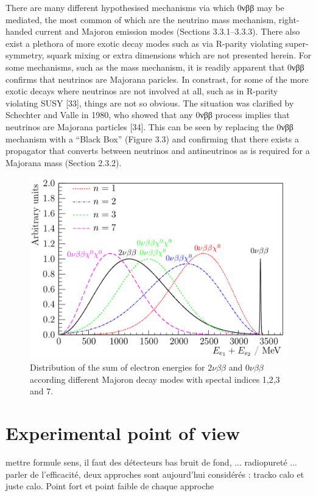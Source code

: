 \documentclass[main.tex]{subfiles}
\begin{document}
\ifx
There are many different hypothesised mechanisms via which 0νββ may be mediated,
the most common of which are the neutrino mass mechanism, right-handed current
and Majoron emission modes (Sections 3.3.1–3.3.3). There also exist a plethora of
more exotic decay modes such as via R-parity violating super-symmetry, squark
mixing or extra dimensions which are not presented herein.
For some mechanisms, such as the mass mechanism, it is readily apparent that 0νββ
confirms that neutrinos are Majorana paricles. In constrast, for some of the more
exotic decays where neutrinos are not involved at all, such as in R-parity violating
SUSY [33], things are not so obvious. The situation was clarified by Schechter and
Valle in 1980, who showed that any 0νββ process implies that neutrinos are Majorana
particles [34]. This can be seen by replacing the 0νββ mechanism with a “Black Box”
(Figure 3.3) and confirming that there exists a propagator that converts between
neutrinos and antineutrinos as is required for a Majorana mass (Section 2.3.2).
\fi

\begin{figure}[h!]
\begin{center}
\includegraphics[scale=0.30]{pictures/Chap2/SpectrumFifferentMechanism.png}
\caption{Distribution of the sum of electron energies for 2$\nu\beta\beta$ and 0$\nu\beta\beta$ according different Majoron decay modes with spectal indices 1,2,3 and 7.}
\label{DifferentbbDecaySpectrum}
\end{center}
\end{figure}



\section{Experimental point of view}\label{sec:ExperimentalSearches}
\NI mettre formule sens, il faut des détecteurs bas bruit de fond, ... radiopureté ... parler de l'efficacité,
\NI deux approches sont aujourd'hui considérés : tracko calo et juste calo. Point fort et point faible de chaque approche
\end{document}
